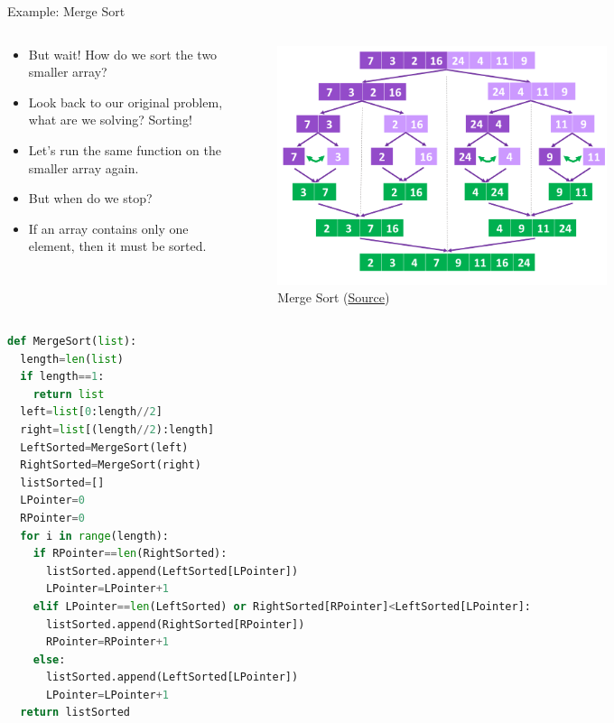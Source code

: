 \documentclass[10pt,xcolor={table,dvipsnames},t]{beamer}
\begin{document}
\begin{frame}{Example: Merge Sort}
  \begin{columns}
    \begin{column}{0.6\textwidth}
      \begin{itemize}
        \item But wait! How do we sort the two smaller array?
        \item Look back to our original problem, what are we solving? Sorting!
        \item Let's run the same function on the smaller array again.
        \item But when do we stop?
        \item If an array contains only one element, then it must be sorted.
      \end{itemize}
    \end{column}
    \begin{column}[T]{0.4\textwidth}
      \begin{figure}
        \includegraphics[width=0.7\textwidth]{img/Merge-Sort.png}
        \caption{Merge Sort (\href{https://www.101computing.net/merge-sort-algorithm/}{Source})}
      \end{figure}
    \end{column}
  \end{columns}
\end{frame}

\begin{frame}[fragile]
\begin{lstlisting}[language=python]
def MergeSort(list):
  length=len(list)
  if length==1:
    return list
  left=list[0:length//2]
  right=list[(length//2):length]
  LeftSorted=MergeSort(left)
  RightSorted=MergeSort(right)
  listSorted=[]
  LPointer=0
  RPointer=0
  for i in range(length):
    if RPointer==len(RightSorted):
      listSorted.append(LeftSorted[LPointer])
      LPointer=LPointer+1
    elif LPointer==len(LeftSorted) or RightSorted[RPointer]<LeftSorted[LPointer]:
      listSorted.append(RightSorted[RPointer])
      RPointer=RPointer+1
    else:
      listSorted.append(LeftSorted[LPointer])
      LPointer=LPointer+1
  return listSorted
\end{lstlisting}
\end{frame}
\end{document}
